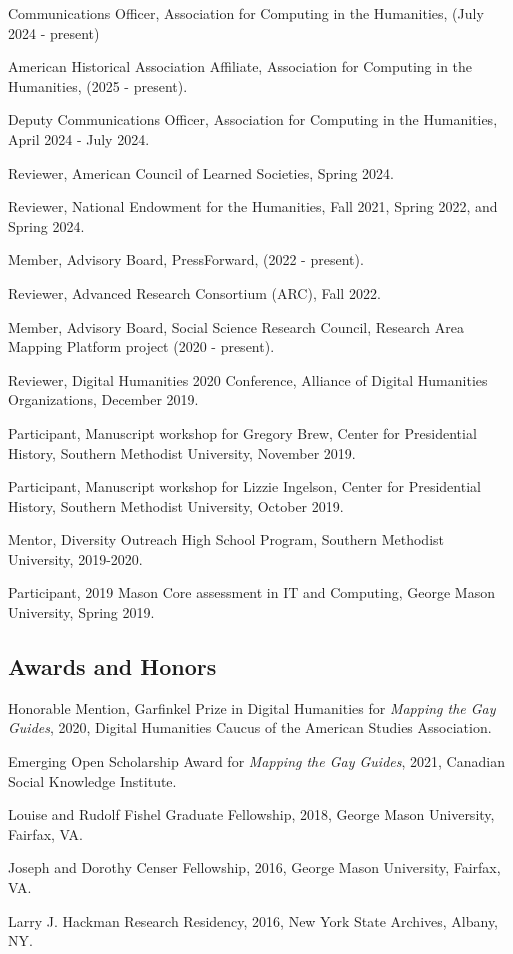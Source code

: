 \documentclass[11pt]{article}
\begin{document}
Communications Officer, Association for Computing in the Humanities, (July 2024 - present)

American Historical Association Affiliate, Association for Computing in the Humanities, (2025 - present).

Deputy Communications Officer, Association for Computing in the Humanities, April 2024 - July 2024.

Reviewer, American Council of Learned Societies, Spring 2024.

Reviewer, National Endowment for the Humanities, Fall 2021, Spring 2022, and Spring 2024.

Member, Advisory Board, PressForward, (2022 - present).

Reviewer, Advanced Research Consortium (ARC), Fall 2022. 

Member, Advisory Board, Social Science Research Council, Research Area Mapping Platform project (2020 - present).

Reviewer, Digital Humanities 2020 Conference, Alliance of Digital Humanities Organizations, December 2019.

Participant, Manuscript workshop for Gregory Brew, Center for Presidential History, Southern Methodist University, November 2019.

Participant, Manuscript workshop for Lizzie Ingelson, Center for Presidential History, Southern Methodist University, October 2019.

Mentor, Diversity Outreach High School Program, Southern Methodist University, 2019-2020.

Participant, 2019 Mason Core assessment in IT and Computing, George Mason University, Spring 2019.

\subsection{Awards and Honors}
Honorable Mention, Garfinkel Prize in Digital Humanities for \emph{Mapping the Gay Guides}, 2020, Digital Humanities Caucus of the American Studies Association.

Emerging Open Scholarship Award for \emph{Mapping the Gay Guides}, 2021, Canadian Social Knowledge Institute.

Louise and Rudolf Fishel Graduate Fellowship, 2018, George Mason University, Fairfax, VA.

Joseph and Dorothy Censer Fellowship, 2016, George Mason University, Fairfax, VA.

Larry J. Hackman Research Residency, 2016, New York State Archives, Albany, NY.
\end{document}
